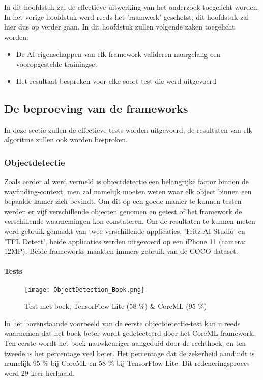 \chapter{}
\label{ch:onderzoek}
In dit hoofdstuk zal de effectieve uitwerking van het onderzoek toegelicht worden. In het vorige hoofdstuk werd reeds het 'raamwerk' geschetst, dit hoofdstuk zal hier dus op verder gaan. In dit hoofdstuk zullen volgende zaken toegelicht worden:

\begin{itemize}
	\item De AI-eigenschappen van elk framework valideren naargelang een vooropgestelde trainingset
	\item Het resultaat bespreken voor elke soort test die werd uitgevoerd
\end{itemize}

\section{De beproeving van de frameworks}
In deze sectie zullen de effectieve tests worden uitgevoerd, de resultaten van elk algoritme zullen ook worden besproken.

\subsection{Objectdetectie}

Zoals eerder al werd vermeld is objectdetectie een belangrijke factor binnen de wayfinding-context, men zal namelijk moeten weten waar elk object binnen een bepaalde kamer zich bevindt. Om dit op een goede manier te kunnen testen werden er vijf verschillende objecten genomen en getest of het framework de verschillende waarnemingen kon constateren. Om de resultaten te kunnen meten werd gebruik gemaakt van twee verschillende applicaties, 'Fritz AI Studio' en 'TFL Detect', beide applicaties werden uitgevoerd op een iPhone 11 (camera: 12MP). Beide frameworks maakten immers gebruik van de COCO-dataset.


\subsubsection{Tests}
	\begin{figure}[H]
		\centering
		\texttt{[image: ObjectDetection\_Book.png]}
		\caption{Test met boek, TensorFlow Lite (58 \%) \& CoreML (95 \%)}
	\end{figure}
In het bovenstaande voorbeeld van de eerste objectdetectie-test kan u reeds waarnemen dat het boek beter wordt gedetecteerd door het CoreML-framework. Ten eerste wordt het boek nauwkeuriger aangeduid door de rechthoek, en ten tweede is het percentage veel beter. Het percentage dat de zekerheid aanduidt is namelijk 95 \% bij CoreML en 58 \% bij TensorFlow Lite. Dit redeneringsproces werd 29 keer herhaald.

